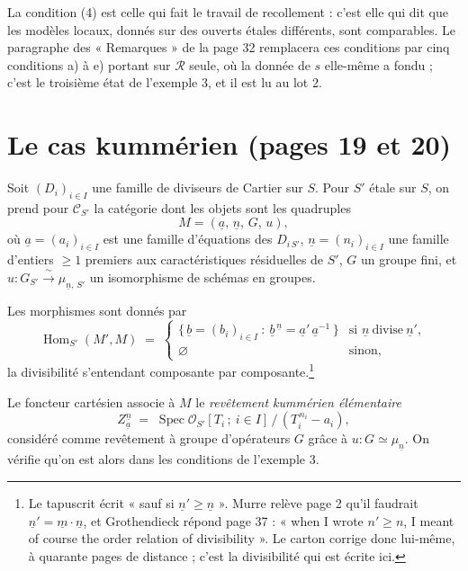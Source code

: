 \documentclass[11pt,a4paper]{article}
\begin{document}
La condition (4) est celle qui fait le travail de recollement : c'est elle qui
dit que les modèles locaux, donnés sur des ouverts étales différents, sont
comparables. Le paragraphe des « Remarques » de la page 32 remplacera ces
conditions par cinq conditions a) à e) portant sur $\mathcal{R}$ seule, où la
donnée de $s$ elle-même a fondu ; c'est le troisième état de l'exemple 3, et il
est lu au lot 2.

\section*{Le cas kummérien (pages 19 et 20)}

Soit $(D_{i})_{i \in I}$ une famille de diviseurs de Cartier sur $S$. Pour
$S'$ étale sur $S$, on prend pour $\mathcal{C}_{S'}$ la catégorie dont les
objets sont les quadruples
\[
  M = (\underline{a},\, \underline{n},\, G,\, u) ,
\]
où $\underline{a} = (a_{i})_{i \in I}$ est une famille d'équations des
$D_{i\,S'}$, $\underline{n} = (n_{i})_{i \in I}$ une famille d'entiers
$\geqslant 1$ premiers aux caractéristiques résiduelles de $S'$, $G$ un groupe
fini, et $u : G_{S'} \xrightarrow{\ \sim\ } \mu_{\underline{n},\,S'}$ un
isomorphisme de schémas en groupes.

Les morphismes sont donnés par
\[
  \operatorname{Hom}_{S'}(M', M) \;=\;
  \begin{cases}
    \bigl\{\, \underline{b} = (b_{i})_{i \in I} \ :\
      \underline{b}^{\,\underline{n}} =
      \underline{a}'\,\underline{a}^{-1} \,\bigr\}
      & \text{si } \underline{n} \ \text{divise}\ \underline{n}' , \\[2pt]
    \varnothing & \text{sinon} ,
  \end{cases}
\]
la divisibilité s'entendant composante par composante.\footnote{Le tapuscrit
écrit « sauf si $\underline{n}' \geqslant \underline{n}$ ». Murre relève page 2
qu'il faudrait $\underline{n}' = \underline{m}\cdot\underline{n}$, et
Grothendieck répond page 37 : « when I wrote $n' \geqslant n$, I meant of
course the order relation of divisibility ». Le carton corrige donc lui-même,
à quarante pages de distance ; c'est la divisibilité qui est écrite ici.}

Le foncteur cartésien associe à $M$ le \emph{revêtement kummérien élémentaire}
\[
  Z^{\underline{n}}_{\underline{a}} \;=\;
  \operatorname{Spec} \mathcal{O}_{S'}[T_{i}\,;\ i \in I]\,/\,
  (T_{i}^{\,n_{i}} - a_{i}) ,
\]
considéré comme revêtement à groupe d'opérateurs $G$ grâce à
$u : G \simeq \mu_{\underline{n}}$. On vérifie qu'on est alors dans les
conditions de l'exemple 3.
\end{document}
